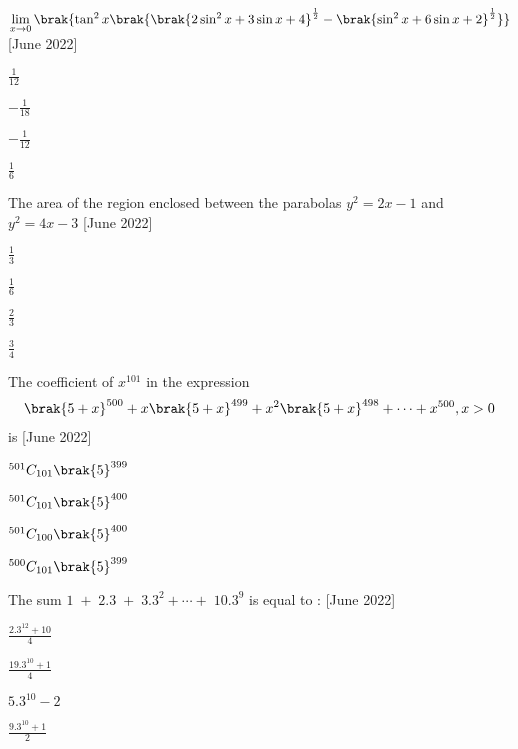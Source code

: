  \item $\lim \limits_{x\to 0}\brak{\tan^2{x}\brak{\brak{2\sin^2{x}+3\sin{x}+4}^{\frac{1}{2}}-\brak{\sin^2{x}+6\sin{x}+2}^{\frac{1}{2}}}}$ \hfill{[June 2022]}
 \begin{enumerate}
     \begin{multicols}{4}
         \item $\frac{1}{12}$
         \item $-\frac{1}{18}$
         \item $-\frac{1}{12}$
         \item $\frac{1}{6}$
     \end{multicols}
 \end{enumerate}
 \bigskip
 \item The area of the region enclosed between the parabolas $y^2=2x-1$ and $y^2=4x-3$ \hfill{[June 2022]}
 \begin{enumerate}
     \begin{multicols}{4}
         \item $\frac{1}{3}$
         \item $\frac{1}{6}$
         \item $\frac{2}{3}$
         \item $\frac{3}{4}$
     \end{multicols}
 \end{enumerate}
\bigskip
 \item The coefficient of $x^{101}$ in the expression 
 \begin{align*}
     \brak{5+x}^{500}+x\brak{5+x}^{499}+x^2\brak{5+x}^{498}+ \cdots + x^{500}, x>0
 \end{align*}
 is \hfill{[June 2022]}
 \begin{enumerate}
     \begin{multicols}{4}
         \item ${}^{501}C_{101}\brak{5}^{399}$
         \item ${}^{501}C_{101}\brak{5}^{400}$
         \item ${}^{501}C_{100}\brak{5}^{400}$
         \item ${}^{500}C_{101}\brak{5}^{399}$
     \end{multicols}
 \end{enumerate}
 \bigskip
 \item The sum $1\;+\;2.3\;+\;3.3^{2}+ \cdots +\;10.3^{9}$ is equal to : \hfill{[June 2022]}
 \begin{enumerate}
    \begin{multicols}{2}
    \item $\frac{2.3^{12}+10}{4}$
    \columnbreak
    \item $\frac{19.3^{10}+1}{4}$
    \end{multicols}
    \begin{multicols}{2}
    \item $5.3^{10}-2$
    \item $\frac{9.3^{10}+1}{2}$
    \end{multicols}
        \end{enumerate}
